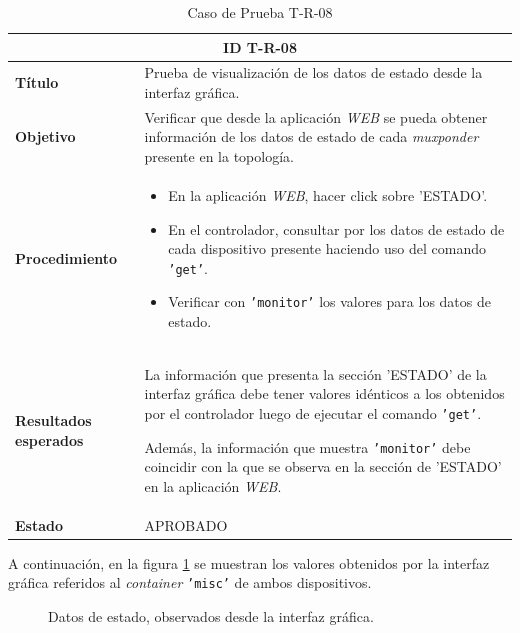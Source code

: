   
  \begin{table}[H]
    \centering
    \begin{tabular}{ |m{2.5cm}|m{11cm}|  }
    \hline
    \multicolumn{2}{|c|}{ \textbf{ID T-R-08} } \\
    \hline
    \centering
    \textbf{Título} & Prueba de visualización de los datos de estado desde la interfaz gráfica.  \\
    \hline
    \centering
    \textbf{Objetivo} & Verificar que desde la aplicación \textit{WEB} se pueda obtener información de los datos de estado de cada \textit{muxponder} presente en la topología.   \\
    \hline
    \centering
    \textbf{Procedimiento} & \begin{itemize}
      \item En la aplicación \textit{WEB}, hacer click sobre 'ESTADO'.
      \item En el controlador, consultar por los datos de estado de cada dispositivo presente haciendo uso del comando \texttt{'get'}. 
      \item Verificar con \texttt{'monitor'} los valores para los datos de estado.
    \end{itemize}     \\
    \hline
    \centering
    \textbf{Resultados esperados} & 
    La información que presenta la sección 'ESTADO' de la interfaz gráfica debe tener valores idénticos a los obtenidos por el controlador luego de ejecutar el comando \texttt{'get'}.

Además, la información que muestra \texttt{'monitor'} debe coincidir con la que se observa en la sección de 'ESTADO' en la aplicación \textit{WEB}.
      \\
    
      \hline
    \centering
      \textbf{Estado}    & APROBADO  \\
    \hline
    \end{tabular}
    
    \caption{Caso de Prueba T-R-08}
    \label{tab:TR08}
    \end{table}

    A continuación, en la figura \ref{fig:test8_1} se muestran los valores obtenidos por la interfaz gráfica referidos al \textit{container} \texttt{'misc'} de ambos dispositivos. 

    \begin{figure}[H]
        \centering
        \caption{Datos de estado, observados desde la interfaz gráfica.}
        \label{fig:test8_1}
      \end{figure}

